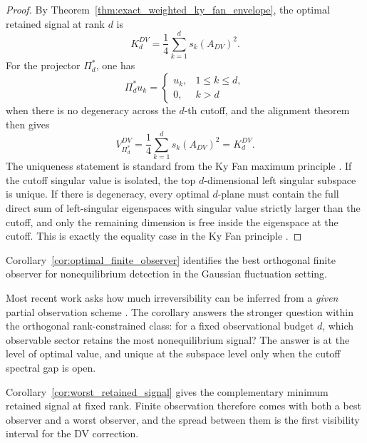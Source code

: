 \documentclass[11pt,a4paper]{article}
\numberwithin{equation}{section}
\theoremstyle{thmcompact}
\theoremstyle{remark}
\begin{document}
\begin{proof}
By Theorem~\ref{thm:exact_weighted_ky_fan_envelope}, the optimal retained signal at rank \(d\) is
\begin{equation}
K_d^{DV}
=
\frac14\sum_{k=1}^{d}s_k(A_{DV})^2.
\end{equation}
For the projector \(\Pi_d^\ast\), one has
\begin{equation}
\Pi_d^\ast u_k=
\begin{cases}
u_k,& 1\le k\le d,\\
0,& k>d
\end{cases}
\end{equation}
when there is no degeneracy across the \(d\)-th cutoff, and the alignment theorem then gives
\begin{equation}
V_{\Pi_d^\ast}^{DV}
=
\frac14\sum_{k=1}^{d}s_k(A_{DV})^2
=
K_d^{DV}.
\end{equation}
The uniqueness statement is standard from the Ky Fan maximum principle \cite{Fan1951,Bhatia1997}. If the cutoff singular value is isolated, the top \(d\)-dimensional left singular subspace is unique. If there is degeneracy, every optimal \(d\)-plane must contain the full direct sum of left-singular eigenspaces with singular value strictly larger than the cutoff, and only the remaining dimension is free inside the eigenspace at the cutoff. This is exactly the equality case in the Ky Fan principle \cite{Fan1951,Bhatia1997}.
\end{proof}

Corollary~\ref{cor:optimal_finite_observer} identifies the best orthogonal finite observer for nonequilibrium detection in the Gaussian fluctuation setting.

Most recent work asks how much irreversibility can be inferred from a \emph{given} partial observation scheme \cite{BaiesiNishiyamaFalasco2023,BlomSongVougaGodecMakarov2025,FritzErtelSeifert2024,Harunari2024,RoldanParrondo2012}. The corollary answers the stronger question within the orthogonal rank-constrained class: for a fixed observational budget \(d\), which observable sector retains the most nonequilibrium signal? The answer is at the level of optimal value, and unique at the subspace level only when the cutoff spectral gap is open.

Corollary~\ref{cor:worst_retained_signal} gives the complementary minimum retained signal at fixed rank. Finite observation therefore comes with both a best observer and a worst observer, and the spread between them is the first visibility interval for the DV correction.
\end{document}
